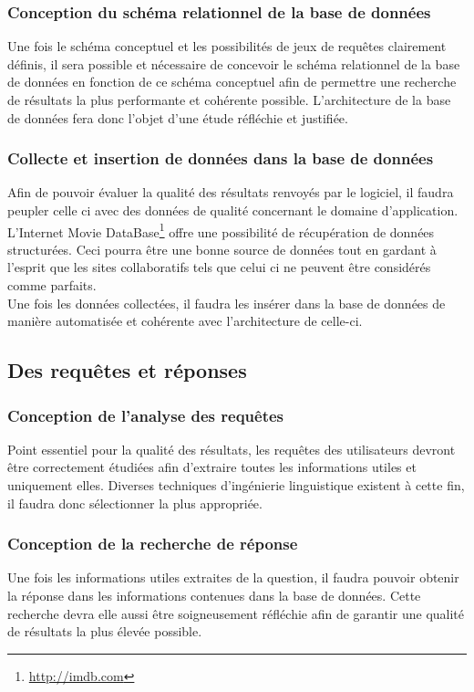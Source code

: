 \documentclass[a4paper,12pt]{article}
\begin{document}
\subsubsection{Conception du schéma relationnel de la base de données}
Une fois le schéma conceptuel et les possibilités de jeux de requêtes clairement définis, il sera possible et nécessaire de concevoir le schéma relationnel de la base de données en fonction de ce schéma conceptuel afin de permettre une recherche de résultats la plus performante et cohérente possible.
L'architecture de la base de données fera donc l'objet d'une étude réfléchie et justifiée.
\subsubsection{Collecte et insertion de données dans la base de données}
Afin de pouvoir évaluer la qualité des résultats renvoyés par le logiciel, il faudra peupler celle ci avec des données de qualité concernant le domaine d'application.
L'Internet Movie DataBase\footnote{\url{http://imdb.com}} offre une possibilité de récupération de données structurées.
Ceci pourra être une bonne source de données tout en gardant à l'esprit que les sites collaboratifs tels que celui ci ne peuvent être considérés comme parfaits. \\

Une fois les données collectées, il faudra les insérer dans la base de données de manière automatisée et cohérente avec l'architecture de celle-ci.
\subsection{Des requêtes et réponses}
\subsubsection{Conception de l'analyse des requêtes}
Point essentiel pour la qualité des résultats, les requêtes des utilisateurs devront être correctement étudiées afin d'extraire toutes les informations utiles et uniquement elles.
Diverses techniques d'ingénierie linguistique existent à cette fin, il faudra donc sélectionner la plus appropriée. 
\subsubsection{Conception de la recherche de réponse}
Une fois les informations utiles extraites de la question, il faudra pouvoir obtenir la réponse dans les informations contenues dans la base de données.
Cette recherche devra elle aussi être soigneusement réfléchie afin de garantir une qualité de résultats la plus élevée possible.
\end{document}
